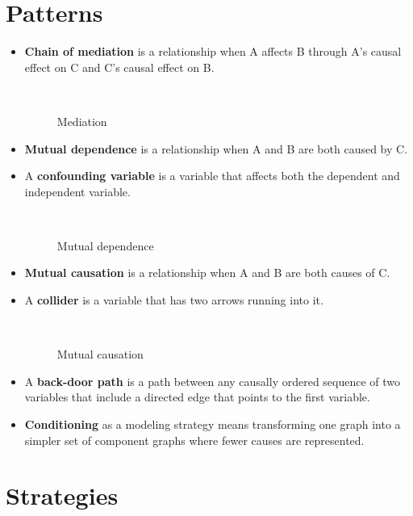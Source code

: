 \section*{Patterns}

\begin{itemize}

\item \textbf{Chain of mediation} is a relationship when A affects B through A's causal effect on C and C's causal effect on B.

\begin{figure}[htp]\centering
\caption{Mediation}\
\end{figure}

\item \textbf{Mutual dependence} is a relationship when A and B are both caused by C.

\item A \textbf{confounding variable} is a variable that affects both the dependent and independent variable.

\begin{figure}[htp]\centering
\caption{Mutual dependence}\
\end{figure}

\item \textbf{Mutual causation} is a relationship when A and B are both causes of C. 

\item A \textbf{collider} is a variable that has two arrows running into it.

\begin{figure}[htp]\centering
\caption{Mutual causation}\
\end{figure}

\item A \textbf{back-door path} is a path between any causally ordered sequence  of two variables that include a directed edge that points to the first variable. 

\item \textbf{Conditioning} as a modeling strategy means transforming one graph into a simpler set of component graphs where fewer causes are represented.

\end{itemize}

\section*{Strategies}

